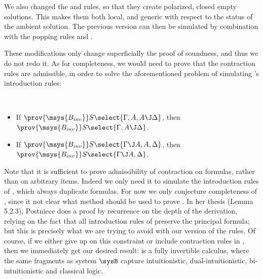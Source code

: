 \begin{remark}
  We also changed the \rsf{\bot{-}} and \rsf{\top{+}} rules, so that they create
  polarized, closed empty solutions. This makes them both local, and generic
  with respect to the status of the ambient solution. The previous version can
  then be simulated by combination with the popping rules  and
  .
\end{remark}

These modifications only change superficially the proof of soundness, and thus
we do not redo it. As for completeness, we would need to prove that the
contraction rules are admissible, in order to solve the aforementioned problem
of simulating 's introduction rules:

\begin{lemma}
  ~\\\vspace{-1em}
  \begin{itemize}
    \item If $\prov{\msys{B_{inv}}} S\select{\Gamma, A, A \J \Delta}$, then
          $\prov{\msys{B_{inv}}} S\select{\Gamma, A \J \Delta}$.
    \item If $\prov{\msys{B_{inv}}} S\select{\Gamma \J A, A, \Delta}$, then
          $\prov{\msys{B_{inv}}} S\select{\Gamma \J A, \Delta}$.
  \end{itemize}
\end{lemma}

Note that it is sufficient to prove admissibility of contraction on formulas,
rather than on arbitrary items. Indeed we only need it to simulate the
introduction rules of , which always duplicate formulas. For now we
only conjecture completeness of , since it not clear what method
should be used to prove . In her thesis
\cite{postniece_proof_2010} (Lemma 5.2.3), Postniece does a proof by recurrence
on the depth of the derivation, relying on the fact that all introduction rules
of  preserve the principal formula; but this is precisely what we
are trying to avoid with our version of the rules. Of course, if we either give
up on this constraint or include contraction rules in , then we
immediately get our desired result:  is a fully invertible
calculus, where the same fragments as system $\sysB$ capture intuitionistic,
dual-intuitionistic, bi-intuitionistic and classical logic.

